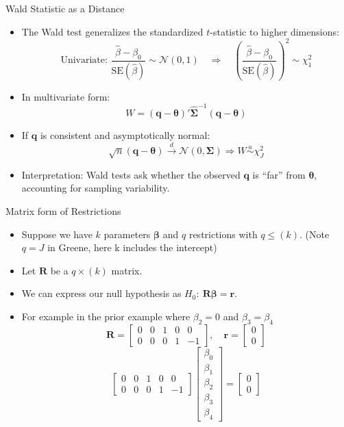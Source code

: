 \documentclass[aspectratio=169, handout, t]{beamer}
\numberwithin{equation}{section}
\begin{document}

\begin{frame}{Wald Statistic as a Distance}
\begin{itemize}
\item The Wald test generalizes the standardized $t$-statistic to higher dimensions:
\[
\text{Univariate: } \frac{\hat{\beta} - \beta_0}{\text{SE}(\hat{\beta})} \sim \mathcal{N}(0,1)
\quad \Rightarrow \quad \left( \frac{\hat{\beta} - \beta_0}{\text{SE}(\hat{\beta})} \right)^2 \sim \chi^2_1
\]
\item In multivariate form:
\[
W = (\bm{q} - \bm{\theta})' \hat{\bm{\Sigma}}^{-1} (\bm{q} - \bm{\theta})
\]
\item If $\bm{q}$ is consistent and asymptotically normal:
\[
\sqrt{n}(\bm{q} - \bm{\theta}) \overset{d}{\to} \mathcal{N}(0, \bm{\Sigma}) \Rightarrow W \overset{a}{\sim} \chi^2_J
\]
\item Interpretation: Wald tests ask whether the observed $\bm{q}$ is ``far'' from $\bm{\theta}$, accounting for sampling variability.
\end{itemize}
\end{frame}


\begin{frame}{Matrix form of Restrictions}
\begin{itemize}
\item Suppose we have $k$ parameters $\bm{\beta}$ and $q$ restrictions with $q\leq (k)$. (Note $q=J$ in Greene, here k includes the intercept)
\item Let $\bm{R}$ be a $q\times(k)$ matrix.
\item We can express our null hypothesis as $H_0:\ \bm{R\beta}=\bm{r}$.
\item For example in the prior example where $\beta_2=0$ and $\beta_3=\beta_4$\\
$$\bm{R}=\begin{bmatrix} 0& 0&1& 0&0\\ 0&0& 0& 1&-1\end{bmatrix},\quad \bm{r}=\begin{bmatrix} 0\\0\end{bmatrix}$$
$$\begin{bmatrix} 0&0& 1& 0&0\\0& 0& 0& 1&-1\end{bmatrix} \begin{bmatrix} \beta_0\\\beta_1\\\beta_2\\\beta_3\\\beta_4 \end{bmatrix}=\begin{bmatrix} 0\\0\end{bmatrix}$$
\end{itemize}
\end{frame}
\end{document}
